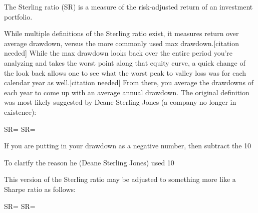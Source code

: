 The Sterling ratio (SR) is a measure of the risk-adjusted return of an investment portfolio.

While multiple definitions of the Sterling ratio exist, it measures return over average drawdown, versus the more commonly used max drawdown.[citation needed] While the max drawdown looks back over the entire period you’re analyzing and takes the worst point along that equity curve, a quick change of the look back allows one to see what the worst peak to valley loss was for each calendar year as well.[citation needed] From there, you average the drawdowns of each year to come up with an average annual drawdown. The original definition was most likely suggested by Deane Sterling Jones (a company no longer in existence):


{\displaystyle SR={}} SR=


If you are putting in your drawdown as a negative number, then subtract the 10%

To clarify the reason he (Deane Sterling Jones) used 10%

This version of the Sterling ratio may be adjusted to something more like a Sharpe ratio as follows:

{\displaystyle SR={}} SR=
